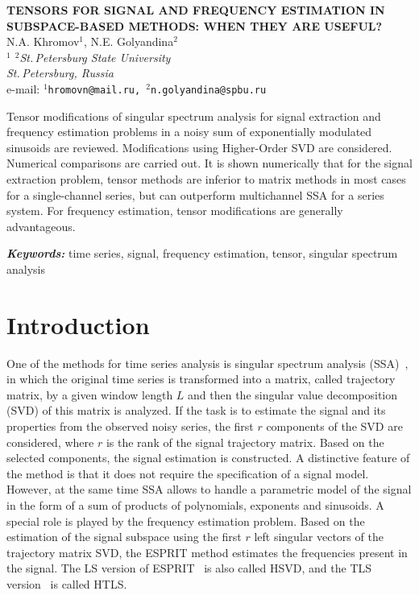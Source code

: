 \documentclass[12pt]{article}
\providecommand{\keywords}[1]
{
  \vspace{2mm}\hspace{20pt}\textbf{\textit{Keywords:}} #1
}
\providecommand{\abskeyw}[2]
{
  \begin{small}
    \begin{adjustwidth}{10mm}{10mm}
      \vspace{1mm}\hspace{20pt}#1

      \keywords{#2}
    \end{adjustwidth}
  \end{small}
}
\theoremstyle{definition}
\begin{document}
\begin{center}
  {\Large\bf TENSORS FOR SIGNAL AND FREQUENCY ESTIMATION IN
  SUBSPACE-BASED METHODS: WHEN THEY ARE USEFUL?}\\\vspace{2mm} {\sc N.A.
  Khromov$^1$, N.E. Golyandina$^2$}\\\vspace{2mm}
  {\it $^{1}$ $^{2}$St.\,Petersburg State University\\
  St.\,Petersburg, Russia\\} e-mail: {\tt $^1$hromovn@mail.ru,
  $^2$n.golyandina@spbu.ru}

  \abskeyw{Tensor modifications of singular spectrum analysis for
    signal extraction and frequency estimation problems in a noisy sum
    of exponentially modulated sinusoids are reviewed. Modifications
    using Higher-Order SVD are considered. Numerical comparisons are
    carried out. It is shown numerically that for the signal extraction
    problem, tensor methods are inferior to matrix methods in most
    cases for a single-channel series, but can outperform multichannel
    SSA for a series system. For frequency estimation, tensor
  modifications are generally advantageous.}{time series,
  signal, frequency estimation, tensor, singular spectrum analysis}
\end{center}

\section{Introduction}

One of the methods for time series analysis is singular spectrum
analysis (SSA)~\cite{Golyandina2001}, in which the original time
series is transformed into a matrix, called trajectory matrix, by a
given window length $L$ and then the singular value decomposition
(SVD) of this matrix is analyzed. If the task is to estimate the
signal and its properties from the observed noisy series, the first
$r$ components of the SVD are considered, where $r$ is the rank of
the signal trajectory matrix. Based on the selected components, the
signal estimation is constructed. A distinctive feature of the method
is that it does not require the specification of a signal model.
However, at the same time SSA allows to handle a parametric model of
the signal in the form of a sum of products of polynomials, exponents
and sinusoids. A special role is played by the frequency estimation
problem. Based on the estimation of the signal subspace using the
first $r$ left singular vectors of the trajectory matrix SVD,
the ESPRIT method estimates the frequencies present in the signal.
The LS version of ESPRIT~\cite{Roy1986} is also called HSVD, and the TLS
version~\cite{Roy1989} is called HTLS.
\end{document}
